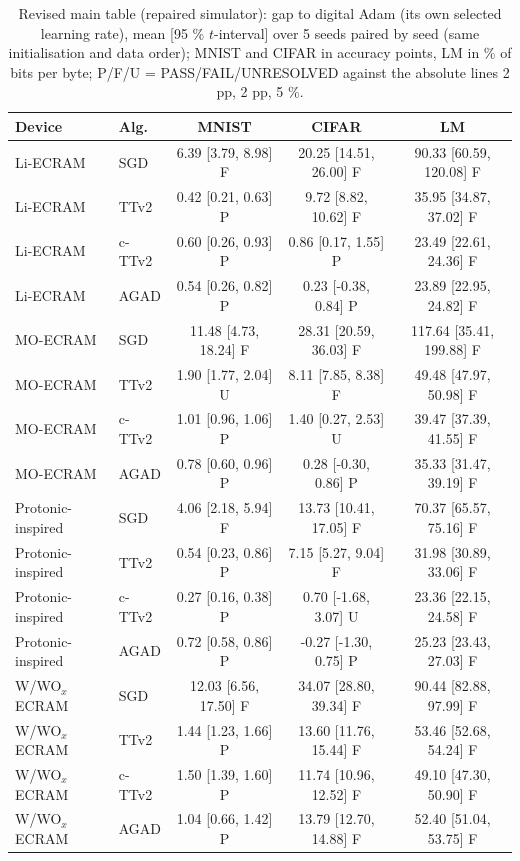 \begin{table}[t]\centering\footnotesize\caption{Revised main table (repaired simulator): gap to digital Adam (its own selected learning rate), mean [95 \% $t$-interval] over 5 seeds paired by seed (same initialisation and data order); MNIST and CIFAR in accuracy points, LM in \% of bits per byte; P/F/U = PASS/FAIL/UNRESOLVED against the absolute lines 2 pp, 2 pp, 5 \%.}\label{tab:rev_vs_adam}
\begin{tabular}{llccc}\toprule Device & Alg. & MNIST & CIFAR & LM\\\midrule
Li-ECRAM & SGD & 6.39 [3.79, 8.98] F & 20.25 [14.51, 26.00] F & 90.33 [60.59, 120.08] F\\
Li-ECRAM & TTv2 & 0.42 [0.21, 0.63] P & 9.72 [8.82, 10.62] F & 35.95 [34.87, 37.02] F\\
Li-ECRAM & c-TTv2 & 0.60 [0.26, 0.93] P & 0.86 [0.17, 1.55] P & 23.49 [22.61, 24.36] F\\
Li-ECRAM & AGAD & 0.54 [0.26, 0.82] P & 0.23 [-0.38, 0.84] P & 23.89 [22.95, 24.82] F\\
MO-ECRAM & SGD & 11.48 [4.73, 18.24] F & 28.31 [20.59, 36.03] F & 117.64 [35.41, 199.88] F\\
MO-ECRAM & TTv2 & 1.90 [1.77, 2.04] U & 8.11 [7.85, 8.38] F & 49.48 [47.97, 50.98] F\\
MO-ECRAM & c-TTv2 & 1.01 [0.96, 1.06] P & 1.40 [0.27, 2.53] U & 39.47 [37.39, 41.55] F\\
MO-ECRAM & AGAD & 0.78 [0.60, 0.96] P & 0.28 [-0.30, 0.86] P & 35.33 [31.47, 39.19] F\\
Protonic-inspired & SGD & 4.06 [2.18, 5.94] F & 13.73 [10.41, 17.05] F & 70.37 [65.57, 75.16] F\\
Protonic-inspired & TTv2 & 0.54 [0.23, 0.86] P & 7.15 [5.27, 9.04] F & 31.98 [30.89, 33.06] F\\
Protonic-inspired & c-TTv2 & 0.27 [0.16, 0.38] P & 0.70 [-1.68, 3.07] U & 23.36 [22.15, 24.58] F\\
Protonic-inspired & AGAD & 0.72 [0.58, 0.86] P & -0.27 [-1.30, 0.75] P & 25.23 [23.43, 27.03] F\\
W/WO$_x$ ECRAM & SGD & 12.03 [6.56, 17.50] F & 34.07 [28.80, 39.34] F & 90.44 [82.88, 97.99] F\\
W/WO$_x$ ECRAM & TTv2 & 1.44 [1.23, 1.66] P & 13.60 [11.76, 15.44] F & 53.46 [52.68, 54.24] F\\
W/WO$_x$ ECRAM & c-TTv2 & 1.50 [1.39, 1.60] P & 11.74 [10.96, 12.52] F & 49.10 [47.30, 50.90] F\\
W/WO$_x$ ECRAM & AGAD & 1.04 [0.66, 1.42] P & 13.79 [12.70, 14.88] F & 52.40 [51.04, 53.75] F\\

\end{tabular}
\end{table}
